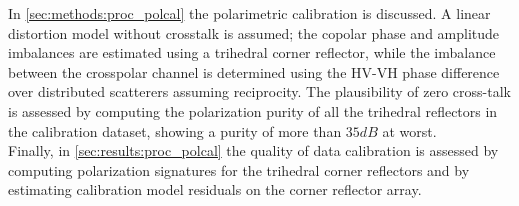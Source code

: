 In \autoref{sec:methods:proc_polcal} the polarimetric calibration is discussed. A linear distortion model without crosstalk is assumed; the copolar phase and amplitude imbalances are estimated using a trihedral corner reflector, while the imbalance between the crosspolar channel is determined using the HV-VH phase difference over distributed scatterers assuming reciprocity. The plausibility of zero cross-talk is assessed by computing the polarization purity of all the trihedral reflectors in the calibration dataset, showing a purity of more than $35 dB$ at worst.\\
Finally, in \autoref{sec:results:proc_polcal} the quality of data calibration is assessed by computing polarization signatures for the trihedral corner reflectors and by estimating calibration model residuals on the corner reflector array. 